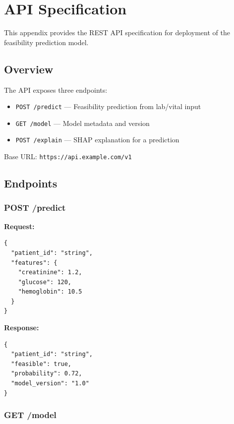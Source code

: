 \chapter{API Specification}
\label{app:api}

This appendix provides the REST API specification for deployment of the feasibility prediction model.

\section{Overview}

The API exposes three endpoints:
\begin{itemize}
\item \texttt{POST /predict} --- Feasibility prediction from lab/vital input
\item \texttt{GET /model} --- Model metadata and version
\item \texttt{POST /explain} --- SHAP explanation for a prediction
\end{itemize}

Base URL: \texttt{https://api.example.com/v1}

\section{Endpoints}

\subsection{POST /predict}

\textbf{Request:}
\begin{lstlisting}
{
  "patient_id": "string",
  "features": {
    "creatinine": 1.2,
    "glucose": 120,
    "hemoglobin": 10.5
  }
}
\end{lstlisting}

\textbf{Response:}
\begin{lstlisting}
{
  "patient_id": "string",
  "feasible": true,
  "probability": 0.72,
  "model_version": "1.0"
}
\end{lstlisting}

\subsection{GET /model}

